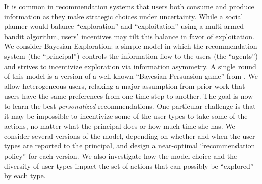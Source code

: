 It is common in recommendation systems that users both consume and produce information as they make strategic choices under uncertainty. While a social planner would balance ``exploration'' and ``exploitation'' using a multi-armed bandit algorithm, users' incentives may tilt this balance in favor of exploitation. We consider Bayesian Exploration: a simple model in which the recommendation system (the ``principal'') controls the information flow to the users (the ``agents'') and strives to incentivize exploration via information asymmetry. A single round of this model is a version of a well-known ``Bayesian Persuasion game'' from \cite{Kamenica-aer11}. We allow heterogeneous users, relaxing a major assumption from prior work that users have the same preferences from one time step to another. The goal is now to learn the best \emph{personalized} recommendations. One particular challenge is that it may be impossible to incentivize some of the user types to take some of the actions, no matter what the principal does or how much time she has. We consider several versions of the model, depending on whether and when the user types are reported to the principal, and design a near-optimal ``recommendation policy'' for each version. We also investigate how the model choice and the diversity of user types impact the set of actions that can possibly be ``explored'' by each type.
